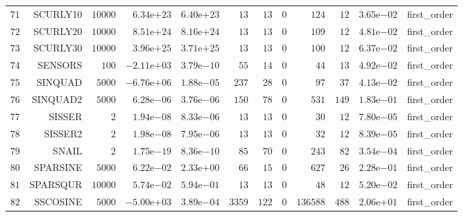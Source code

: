 \begin{longtable}{rrrrrrrrrrrr}
  \(    71\) & SCURLY10 & \( 10000\) & \( 6.34\)e\(+23\) & \( 6.40\)e\(+23\) & \(    13\) & \(    13\) & \(     0\) & \(   124\) & \(    12\) & \( 3.65\)e\(-02\) & first\_order \\
  \(    72\) & SCURLY20 & \( 10000\) & \( 8.51\)e\(+24\) & \( 8.16\)e\(+24\) & \(    13\) & \(    13\) & \(     0\) & \(   109\) & \(    12\) & \( 4.81\)e\(-02\) & first\_order \\
  \(    73\) & SCURLY30 & \( 10000\) & \( 3.96\)e\(+25\) & \( 3.71\)e\(+25\) & \(    13\) & \(    13\) & \(     0\) & \(   100\) & \(    12\) & \( 6.37\)e\(-02\) & first\_order \\
  \(    74\) & SENSORS & \(   100\) & \(-2.11\)e\(+03\) & \( 3.79\)e\(-10\) & \(    55\) & \(    14\) & \(     0\) & \(    44\) & \(    13\) & \( 4.92\)e\(-02\) & first\_order \\
  \(    75\) & SINQUAD & \(  5000\) & \(-6.76\)e\(+06\) & \( 1.88\)e\(-05\) & \(   237\) & \(    28\) & \(     0\) & \(    97\) & \(    37\) & \( 4.13\)e\(-02\) & first\_order \\
  \(    76\) & SINQUAD2 & \(  5000\) & \( 6.28\)e\(-06\) & \( 3.76\)e\(-06\) & \(   150\) & \(    78\) & \(     0\) & \(   531\) & \(   149\) & \( 1.83\)e\(-01\) & first\_order \\
  \(    77\) & SISSER & \(     2\) & \( 1.94\)e\(-08\) & \( 8.33\)e\(-06\) & \(    13\) & \(    13\) & \(     0\) & \(    30\) & \(    12\) & \( 7.80\)e\(-05\) & first\_order \\
  \(    78\) & SISSER2 & \(     2\) & \( 1.98\)e\(-08\) & \( 7.95\)e\(-06\) & \(    13\) & \(    13\) & \(     0\) & \(    32\) & \(    12\) & \( 8.39\)e\(-05\) & first\_order \\
  \(    79\) & SNAIL & \(     2\) & \( 1.75\)e\(-19\) & \( 8.36\)e\(-10\) & \(    85\) & \(    70\) & \(     0\) & \(   243\) & \(    82\) & \( 3.54\)e\(-04\) & first\_order \\
  \(    80\) & SPARSINE & \(  5000\) & \( 6.22\)e\(-02\) & \( 2.33\)e\(+00\) & \(    66\) & \(    15\) & \(     0\) & \(   627\) & \(    26\) & \( 2.28\)e\(-01\) & first\_order \\
  \(    81\) & SPARSQUR & \( 10000\) & \( 5.74\)e\(-02\) & \( 5.94\)e\(-01\) & \(    13\) & \(    13\) & \(     0\) & \(    48\) & \(    12\) & \( 5.20\)e\(-02\) & first\_order \\
  \(    82\) & SSCOSINE & \(  5000\) & \(-5.00\)e\(+03\) & \( 3.89\)e\(-04\) & \(  3359\) & \(   122\) & \(     0\) & \(136588\) & \(   488\) & \( 2.06\)e\(+01\) & first\_order \\

\end{longtable}
